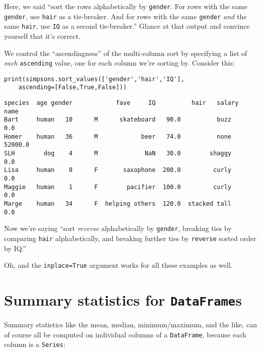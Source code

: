 Here, we said ``sort the rows alphabetically by \texttt{gender}. For rows with
the same \texttt{gender}, use \texttt{hair} as a tie-breaker. And for rows with
the same \texttt{gender} \textit{and} the same \texttt{hair}, use \texttt{IQ}
as a second tie-breaker.'' Glance at that output and convince yourself that
it's correct.

We control the ``ascendingness'' of the multi-column sort by specifying a list
of \textit{each} \texttt{ascending} value, one for each column we're sorting
by. Consider this:

\begin{samepage}
\begin{Verbatim}[fontsize=\small,samepage=true,frame=single,framesep=3mm]
print(simpsons.sort_values(['gender','hair','IQ'],
    ascending=[False,True,False]))
\end{Verbatim}
\vspace{-.2in}

\begin{Verbatim}[fontsize=\small,samepage=true,frame=leftline,framesep=5mm,framerule=1mm]
       species  age gender            fave     IQ          hair   salary
name                                                                    
Bart     human   10      M      skateboard   90.0          buzz      0.0
Homer    human   36      M            beer   74.0          none  52000.0
SLH        dog    4      M             NaN   30.0        shaggy      0.0
Lisa     human    8      F       saxophone  200.0         curly      0.0
Maggie   human    1      F        pacifier  100.0         curly      0.0
Marge    human   34      F  helping others  120.0  stacked tall      0.0
\end{Verbatim}
\end{samepage}

Now we're saying ``sort \textit{reverse} alphabetically by \texttt{gender},
breaking ties by comparing \texttt{hair} alphabetically, and breaking further
ties by \texttt{reverse} sorted order by IQ.''

Oh, and the \texttt{inplace=True} argument works for all these examples as
well.

\section{Summary statistics for \texttt{DataFrame}s}


Summary statistics like the mean, median, minimum/maximum, and the like, can of
course all be computed on individual columns of a \texttt{DataFrame}, because
each column is a \texttt{Series}:

